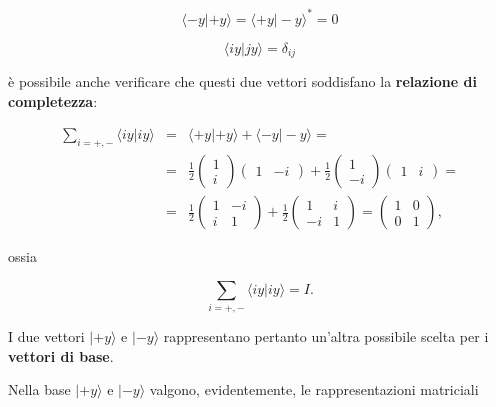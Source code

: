 \begin{equation}
\langle -y | +y \rangle = \langle +y | -y \rangle ^*=0
\end{equation}

\begin{equation}
\langle iy | jy \rangle = \delta_{ij}
\end{equation}

è possibile anche verificare che questi due vettori soddisfano la \textbf{relazione di completezza}:

\begin{eqnarray}
\sum _{i=+,-} \langle iy | iy \rangle &=& \langle +y | +y \rangle + \langle -y | -y \rangle =  \nonumber \\
&=& \frac{1}{2}
\begin{pmatrix}
1\\
i
\end{pmatrix}
\begin{pmatrix}
1 & -i
\end{pmatrix}+
\frac{1}{2}
\begin{pmatrix}
1\\
-i
\end{pmatrix}
\begin{pmatrix}
1 & i
\end{pmatrix}= \nonumber \\
&=& \frac{1}{2}
\begin{pmatrix}
1 & -i\\
i & 1
\end{pmatrix}+
\frac{1}{2}
\begin{pmatrix}
1 & i\\
-i & 1
\end{pmatrix}=
\begin{pmatrix}
1 & 0\\
0 & 1
\end{pmatrix},
\end{eqnarray}

ossia

\begin{equation}
\sum \limits_{i=+,-} \langle iy | iy \rangle =I .
\end{equation}


I due vettori $| +y \rangle $ e $| -y \rangle $ rappresentano pertanto un'altra possibile scelta per i \textbf{vettori di base}.

Nella base $| +y \rangle $ e $| -y \rangle $ valgono, evidentemente, le rappresentazioni matriciali

